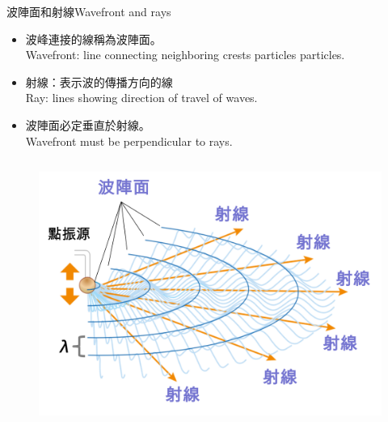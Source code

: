 \documentclass[beamer=true]{standalone}
\begin{document}
\begin{frame}{波陣面和射線Wavefront and rays}
    \begin{itemize}
        \item 波峰連接的線稱為波陣面。\\Wavefront: line connecting neighboring crests particles particles.
        \item 射線：表示波的傳播方向的線\\Ray: lines showing direction of travel of waves.
        \item 波陣面必定垂直於射線。\\Wavefront must be perpendicular to rays.
    \end{itemize}\bigskip
    \begin{columns}
        \begin{figure}
            \centering
            \includegraphics[width=\linewidth]{images/1}

        \end{figure}



\end{columns}
\end{frame}
\end{document}
